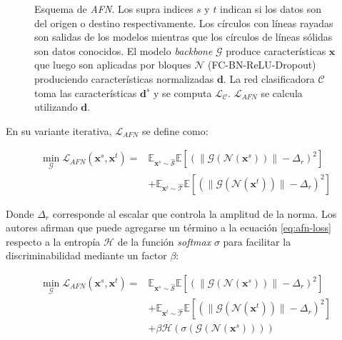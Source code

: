 \begin{figure}[H]
    \caption{Esquema de {\it AFN}. Los supra indices $s$ y $t$ indican si los datos son del origen o destino respectivamente.
    Los c\'irculos con l\'ineas rayadas son salidas de los modelos mientras que los c\'irculos de l\'ineas s\'olidas son datos conocidos. El modelo {\it backbone} $\mathcal{G}$ produce características $\mathbf{x}$ que luego son aplicadas por bloques $\mathcal{N}$ (FC-BN-ReLU-Dropout) produciendo características normalizadas $\mathbf{d}$. La red clasificadora $\mathcal{C}$ toma las características $\mathbf{d}^s$ y se computa $\mathcal{L}_{\mathcal{C}}$. $\mathcal{L}_{AFN}$ se calcula utilizando $\mathbf{d}$.}
    \label{fig:afn-esquema}
\end{figure}

En su variante iterativa, $\mathcal{L}_{AFN}$ se define como:

\begin{align}
    \min_{\mathcal{G}} \mathcal{L}_{AFN}(\mathbf{x}^s, \mathbf{x}^t) = & \mathbb{E}_{\mathbf{x}^s \sim \mathcal{\hat{S}}} \mathbb{E}[(\| \mathcal{G}(\mathcal{N}(\mathbf{x}^s)) \| - \Delta_r)^2] \nonumber \\
                                                                       & + \mathbb{E}_{\mathbf{x}^t \sim \mathcal{\hat{T}}} \mathbb{E}[(\| \mathcal{G}(\mathcal{N}(\mathbf{x}^t)) \| - \Delta_r)^2]
    \label{eq:afn-loss}
\end{align}

Donde $\Delta_r$ corresponde al escalar que controla la amplitud de la norma. Los autores afirman que puede agregarse
un término a la ecuación \ref{eq:afn-loss} respecto a la entropía $\mathcal{H}$ de la función {\it softmax} $\sigma$
para facilitar la discriminabilidad mediante un factor $\beta$:

\begin{align}
    \min_{\mathcal{G}} \mathcal{L}_{AFN}(\mathbf{x}^s, \mathbf{x}^t) = & \mathbb{E}_{\mathbf{x}^s \sim \mathcal{\hat{S}}} \mathbb{E}[(\| \mathcal{G}(\mathcal{N}(\mathbf{x}^s)) \| - \Delta_r)^2] \nonumber   \\
                                                                       & + \mathbb{E}_{\mathbf{x}^t \sim \mathcal{\hat{T}}} \mathbb{E}[(\| \mathcal{G}(\mathcal{N}(\mathbf{x}^t)) \| - \Delta_r)^2] \nonumber \\
                                                                       & + \beta \mathcal{H}(\sigma(\mathcal{G}(\mathcal{N}(\mathbf{x}^s)) ))
    \label{eq:afn-loss-entropy}
\end{align}

